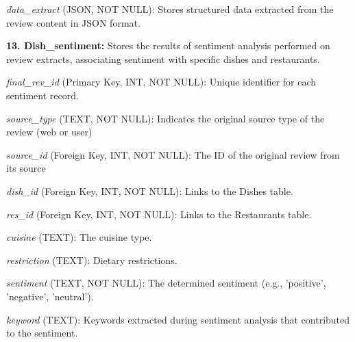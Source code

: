 \textit{data\_extract} (JSON, NOT NULL): Stores structured data extracted from the review content in JSON format.

\textbf{13. Dish\_sentiment:} Stores the results of sentiment analysis performed on review extracts, associating sentiment with specific dishes and restaurants.

\textit{final\_rev\_id} (Primary Key, INT, NOT NULL): Unique identifier for each sentiment record.

\textit{source\_type} (TEXT, NOT NULL): Indicates the original source type of the review (web or user)

\textit{source\_id} (Foreign Key, INT, NOT NULL): The ID of the original review from its source

\textit{dish\_id} (Foreign Key, INT, NOT NULL): Links to the Dishes table.

\textit{res\_id} (Foreign Key, INT, NOT NULL): Links to the Restaurants table.

\textit{cuisine} (TEXT): The cuisine type.

\textit{restriction} (TEXT): Dietary restrictions.

\textit{sentiment} (TEXT, NOT NULL): The determined sentiment (e.g., 'positive', 'negative', 'neutral').

\textit{keyword} (TEXT): Keywords extracted during sentiment analysis that contributed to the sentiment.
